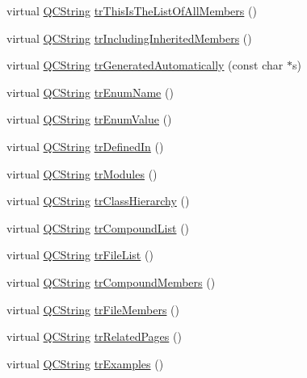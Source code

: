 \begin{DoxyCompactItemize}
\item 
virtual \hyperlink{class_q_c_string}{Q\-C\-String} \hyperlink{class_translator_catalan_a011ff392bb2087e2804dc648db7b3bdd}{tr\-This\-Is\-The\-List\-Of\-All\-Members} ()
\item 
virtual \hyperlink{class_q_c_string}{Q\-C\-String} \hyperlink{class_translator_catalan_ae6babe31ac1979ada5737392536bd239}{tr\-Including\-Inherited\-Members} ()
\item 
virtual \hyperlink{class_q_c_string}{Q\-C\-String} \hyperlink{class_translator_catalan_a25156a73baa8406a915eaa5a6824b359}{tr\-Generated\-Automatically} (const char $\ast$s)
\item 
virtual \hyperlink{class_q_c_string}{Q\-C\-String} \hyperlink{class_translator_catalan_a50df17e22ad96870c7937be7e1ab8dfc}{tr\-Enum\-Name} ()
\item 
virtual \hyperlink{class_q_c_string}{Q\-C\-String} \hyperlink{class_translator_catalan_a5b1d2d5c6825641661ff2cfaeb84307e}{tr\-Enum\-Value} ()
\item 
virtual \hyperlink{class_q_c_string}{Q\-C\-String} \hyperlink{class_translator_catalan_a5ee5473527c64fc3827deca81e253acf}{tr\-Defined\-In} ()
\item 
virtual \hyperlink{class_q_c_string}{Q\-C\-String} \hyperlink{class_translator_catalan_aef7bca894dd93b7fd6803518cede7ef7}{tr\-Modules} ()
\item 
virtual \hyperlink{class_q_c_string}{Q\-C\-String} \hyperlink{class_translator_catalan_a6676bf94846fa80e4a23cf9ea3214b54}{tr\-Class\-Hierarchy} ()
\item 
virtual \hyperlink{class_q_c_string}{Q\-C\-String} \hyperlink{class_translator_catalan_adc612d045d0abf0cfa5085254fca8db5}{tr\-Compound\-List} ()
\item 
virtual \hyperlink{class_q_c_string}{Q\-C\-String} \hyperlink{class_translator_catalan_a1c967abf4f2578ff4185ab2e10f71e14}{tr\-File\-List} ()
\item 
virtual \hyperlink{class_q_c_string}{Q\-C\-String} \hyperlink{class_translator_catalan_a05e152ef7d0c15bb2b34fc12e1a25c56}{tr\-Compound\-Members} ()
\item 
virtual \hyperlink{class_q_c_string}{Q\-C\-String} \hyperlink{class_translator_catalan_ae5ab09d67500e729b9f1b29f4ea57425}{tr\-File\-Members} ()
\item 
virtual \hyperlink{class_q_c_string}{Q\-C\-String} \hyperlink{class_translator_catalan_a8ed40826492d6303375b3031fc88d3b2}{tr\-Related\-Pages} ()
\item 
virtual \hyperlink{class_q_c_string}{Q\-C\-String} \hyperlink{class_translator_catalan_a29f3ce9451daa973dcde36e7d0cab549}{tr\-Examples} ()

\end{DoxyCompactItemize}
